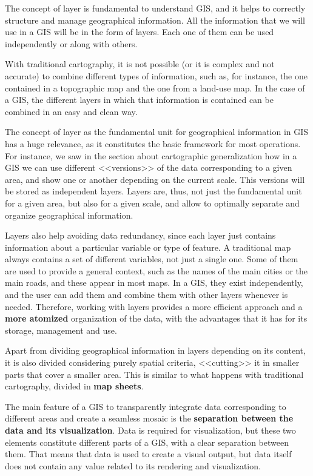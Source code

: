 The concept of layer is fundamental to understand GIS, and it helps to correctly structure and manage geographical information. All the information that we will use in a GIS will be in the form of layers. Each one of them can be used independently or along with others.

With traditional cartography, it is not possible (or it is complex and not accurate) to combine different types of information, such as, for instance, the one contained in a topographic map and the one from a land-use map. In the case of a GIS, the different layers in which that information is contained can be combined in an easy and clean way.

The concept of layer as the fundamental unit for geographical information in GIS has a huge relevance, as it constitutes the basic framework for most operations. For instance, we saw in the section about cartographic generalization how in a GIS we can use different <<versions>> of the data corresponding to a given area, and show one or another depending on the current scale. This versions will be stored as independent layers. Layers are, thus, not just the fundamental unit for a given area, but also for a given scale, and allow to optimally separate and organize geographical information. 

Layers also help avoiding data redundancy, since each layer just contains information about a particular variable or type of feature. A traditional map always contains a set of different variables, not just a single one. Some of them are used to provide a general context, such as the names of the main cities or the main roads, and these appear in most maps. In a GIS, they exist independently, and the user can add them and combine them with other layers whenever is needed. Therefore, working with layers provides a more efficient approach and a \textbf{more atomized} organization of the data, with the advantages that it has for its storage, management and use.

Apart from dividing geographical information in layers depending on its content, it is also divided considering purely spatial criteria, <<cutting>> it in smaller parts that cover a smaller area. This is similar to what happens with traditional cartography, divided in \textbf{map sheets}.

The main feature of a GIS to transparently integrate data corresponding to different areas and create a seamless mosaic is the \textbf{separation between the data and its visualization}. Data is required for visualization, but these two elements constitute different parts of a GIS, with a clear separation between them. That means that data is used to create a visual output, but data itself does not contain any value related to its rendering and visualization.

